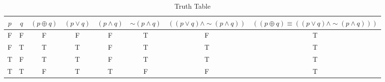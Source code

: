 \begin{table}[ht]
\caption{Truth Table}
\centering
\begin{tabular}{|c|c||c|c|c|c|c|c|}
\hline
$ p $ & $ q $ & $ (p \oplus q) $ & $ (p \vee q) $ & $ (p \wedge q) $ & $  \sim (p \wedge q) $ & $ ((p \vee q) \wedge  \sim (p \wedge q)) $ & $ ((p \oplus q) \equiv ((p \vee q) \wedge  \sim (p \wedge q))) $ \\
\hline
F & F & F & F & F & T & F & T \\
F & T & T & T & F & T & T & T \\
T & F & T & T & F & T & T & T \\
T & T & F & T & T & F & F & T \\
\hline
\end{tabular}
\label{table:tt1}
\end{table}
